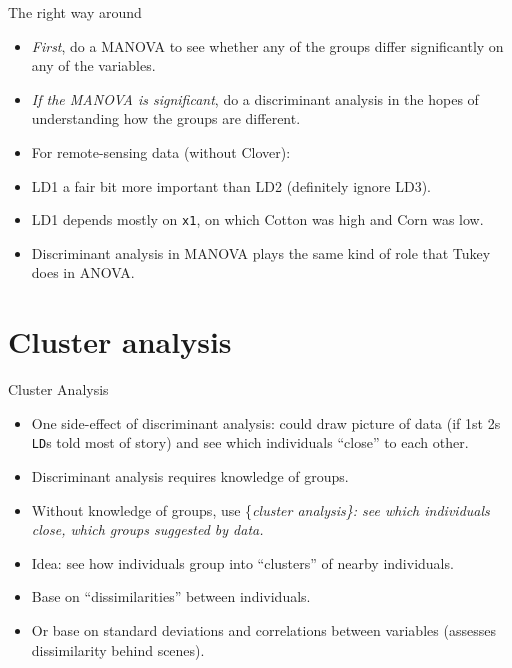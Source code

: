 \documentclass[ignorenonframetext,]{beamer}
\begin{document}
\begin{frame}[fragile]{The right way around}
\protect\hypertarget{the-right-way-around}{}

\begin{itemize}
\item
  \emph{First}, do a MANOVA to see whether any of the groups differ
  significantly on any of the variables.
\item
  \emph{If the MANOVA is significant}, do a discriminant analysis in the
  hopes of understanding how the groups are different.
\item
  For remote-sensing data (without Clover):
\item
  LD1 a fair bit more important than LD2 (definitely ignore LD3).
\item
  LD1 depends mostly on \texttt{x1}, on which Cotton was high and Corn
  was low.
\item
  Discriminant analysis in MANOVA plays the same kind of role that Tukey
  does in ANOVA.
\end{itemize}

\end{frame}

\hypertarget{cluster-analysis}{%
\section{Cluster analysis}\label{cluster-analysis}}

\begin{frame}[fragile]{Cluster Analysis}
\protect\hypertarget{cluster-analysis-1}{}

\begin{itemize}
\item
  One side-effect of discriminant analysis: could draw picture of data
  (if 1st 2s \texttt{LD}s told most of story) and see which individuals
  ``close'' to each other.
\item
  Discriminant analysis requires knowledge of groups.
\item
  Without knowledge of groups, use \{\em cluster analysis\}: see which
  individuals close, which groups suggested by data.
\item
  Idea: see how individuals group into ``clusters'' of nearby
  individuals.
\item
  Base on ``dissimilarities'' between individuals.
\item
  Or base on standard deviations and correlations between variables
  (assesses dissimilarity behind scenes).
\end{itemize}

\end{frame}
\end{document}
